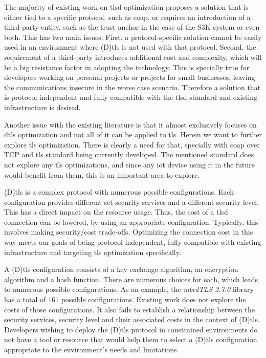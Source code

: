 \documentclass{llncs}
\begin{document}
The majority of existing work on \gls{tlsd} optimization proposes 
a solution that is either tied to a
specific protocol, such as \gls{coap}, or requires an introduction of a third-party
entity, such as the trust anchor in the case of the S3K system\cite{S3KScala62:online} or
even both. This has two main issues. First, a protocol-specific solution cannot
be easily used in an environment where (D)\gls{tls} is not used with that protocol.
Second, the requirement of a third-party
introduces additional cost and complexity, which will be a big resistance factor
in adopting the technology. This is specially true for developers working on
personal projects or projects for small businesses, leaving the communications insecure
in the worse case scenario. Therefore a solution that is protocol independent and fully 
compatible with the \gls{tlsd} standard and existing infrastructure is desired.

Another issue with the existing literature is that it almost exclusively focuses on \gls{dtls} optimization
and not all of it can be applied to \gls{tls}. Herein we want to further explore \gls{tls} optimization. 
There is clearly a need for that,
specially with \gls{coap} over TCP and \gls{tls} standard being currently developed. The
mentioned standard does not explore any \gls{tls} optimizations, and since any
\gls{iot} device using it in the future would benefit from them, this is an important
area to explore.

(D)\gls{tls} is a complex protocol with numerous possible configurations. Each configuration
provides different set security services and a different security level. This has a direct
impact on the resource usage. Thus, the cost of a \gls{tlsd} connection can be lowered,
by using an appropriate configuration. Typically, this involves making security/cost trade-offs.
Optimizing the connection cost in this way meets our goals of being protocol independent, fully compatible with
existing infrastructure and targeting \gls{tls} optimization specifically.

A (D)\gls{tls} configuration consists of a key exchange algorithm, an encryption algorithm and
a hash function. There are numerous choices for each, which leads to
numerous possible configurations. As an example, the \textit{mbedTLS 2.7.0} library has a total
of $161$ possible configurations.
Existing work does not explore the costs of those configurations. It also fails to
establish a relationship between the security services, security level and their associated
costs in the context of (D)\gls{tls}. Developers wishing to deploy the (D)\gls{tls} protocol
in constrained environments do not have a tool or resource that would help them to select a (D)\gls{tls}
configuration appropriate to the environment's needs and limitations.
\end{document}
